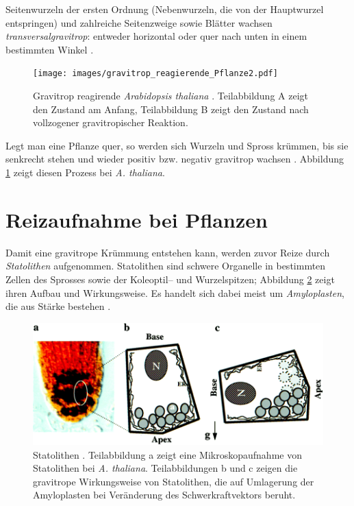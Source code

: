 \documentclass[
11pt, 
ngerman,
listof=totocnumbered,
oneside,
bibliography=totocnumbered,
abstracton
]{scrreprt}
\begin{document}
Seitenwurzeln der ersten Ordnung (Nebenwurzeln, die von der Hauptwurzel entspringen) und zahlreiche Seitenzweige sowie Blätter wachsen \emph{transversalgravitrop}: entweder horizontal oder quer nach unten in einem bestimmten Winkel \parencite[449]{Strasburger}. 

\begin{figure}[H]
\centering 
 \texttt{[image: images/gravitrop\_reagierende\_Pflanze2.pdf]}
 \caption{Gravitrop reagirende \emph{Arabidopsis thaliana} \parencite[5]{Masson2002}. Teilabbildung A zeigt den Zustand am Anfang, Teilabbildung B zeigt den Zustand nach vollzogener gravitropischer Reaktion. \label{gravitrop_reagierende_Pflanze}}
\end{figure} 
 
Legt man eine Pflanze quer, so werden sich Wurzeln und Spross krümmen, bis sie senkrecht stehen und wieder positiv bzw. negativ gravitrop wachsen \parencite[528]{Luettge}. Abbildung \ref{gravitrop_reagierende_Pflanze} zeigt diesen Prozess bei \emph{A. thaliana}. 

\section{Reizaufnahme bei Pflanzen}

Damit eine gravitrope Krümmung entstehen kann, werden zuvor Reize durch \emph{Statolithen} aufgenommen. Statolithen sind schwere Organelle in bestimmten Zellen des Sprosses sowie der Koleoptil-- und Wurzelspitzen; Abbildung \ref{Statolithen} zeigt ihren Aufbau und Wirkungsweise. Es handelt sich dabei meist um \emph{Amyloplasten}, die aus Stärke bestehen \parencite[530]{Luettge}.

\begin{figure}[H]
	\centering 
	\includegraphics[width = 0.9\linewidth]{images/Statolithen2.png}
	\caption{Statolithen \parencite[345]{Chen1999}. Teilabbildung a zeigt eine Mikroskopaufnahme von Statolithen bei \emph{A. thaliana}. Teilabbildungen b und c zeigen die gravitrope Wirkungsweise von Statolithen, die auf Umlagerung der Amyloplasten bei Veränderung des Schwerkraftvektors beruht. \label{Statolithen}}
\end{figure} 
\end{document}
